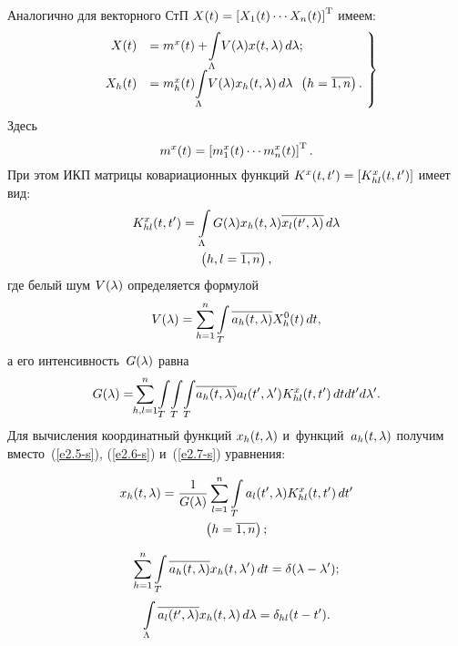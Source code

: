 \begin{multicols}{2}
Аналогично для векторного СтП $X(t) \hm=\lk X_1(t) \cdots X_n(t)\rk^{\mathrm{T}}$ имеем:
  \begin{equation}
  \left.
    \begin{array}{rl}
    X(t) &= m^x (t) + \displaystyle \!\int\limits_\Lambda \!V(\lambda) x (t,\lambda) \,d\lambda;\\[6pt]
    X_h(t) &= m_h^x (t) \displaystyle \!\int\limits_\Lambda \!V(\lambda) x_h (t,\lambda) \,d\lambda\enskip 
\left(h=\overline{1,n}\right).\\
     \end{array}
\!     \right\}\!
     \label{e2.8-s}
\end{equation}
Здесь 
$$
m^x (t) = \left[ m_1^x (t) \cdots m_n^x (t)\right]^{\mathrm{T}}.
$$
 При этом ИКП матрицы 
ковариационных функций $K^x (t, t') \hm= \lk K_{hl}^x (t,t')\rk$ имеет вид:
 \begin{multline}
 K_{hl}^x (t,t') = \int\limits_\Lambda G(\lambda) x_h (t,\lambda) \overline{x_l(t',\lambda)} 
\,d\lambda \\
 \left(h,l=\overline{1,n}\right),\label{e2.9-s}
\end{multline}
где белый шум $V(\lambda)$  определяется формулой
    $$
    V(\lambda) = \sum\limits_{h=1}^n \int\limits_T \overline{a_h (t,\lambda)} X_h^0 (t)\, dt,
    $$
а его интенсивность~$G(\lambda)$ равна
    $$
    G(\lambda) = \!\!\sum\limits_{h,l=1}^n \!\int\limits_T \!\int\limits_T\!\int\limits_T \!\overline{a_h (t,\lambda)} a_l 
(t',\lambda') K_{hl}^x (t,t') \,dtdt' d\lambda'.
$$
Для вычисления координатный функций $x_h (t,\lambda)$ и~функций~$a_h (t,\lambda)$ 
получим вместо~(\ref{e2.5-s}), (\ref{e2.6-s}) и~(\ref{e2.7-s}) уравнения:

\noindent
\begin{multline}
x_h (t,\lambda) =\displaystyle\frac{\displaystyle 1\mathstrut}{\displaystyle G(\lambda)\mathstrut} \sum\limits_{l=1}^n \int\limits_T a_l (t',\lambda) K_{hl}^x 
(t,t') \,dt' \\
 \left(h=\overline{1,n}\right);
\label{e2.10-s}
\end{multline}

\noindent
\begin{equation}
\sum\limits_{h=1}^n \int\limits_T \overline{a_h(t,\lambda)} x_h (t, \lambda')\, dt = \delta (\lambda-\lambda');
\label{e2.11-s}
\end{equation}
$$
\int\limits_\Lambda \overline{a_l(t',\lambda)} x_h (t, \lambda) \,d\lambda = \delta_{hl} (t-t').
$$


\end{multicols}
